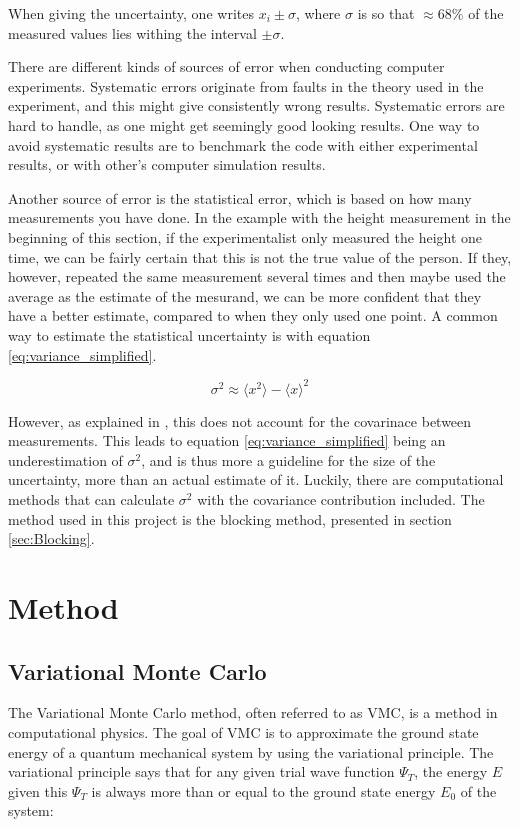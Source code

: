 \documentclass[norsk,a4paper,12pt]{article}
\begin{document}
When giving the uncertainty, one writes $x_i \pm \sigma$, where $\sigma$ is so that $\approx 68 \%$ of the measured values lies withing the interval $\pm \sigma$. 

There are different kinds of sources of error when conducting computer experiments. Systematic errors originate from faults in the theory used in the experiment, and this might give consistently wrong results. Systematic errors are hard to handle, as one might get seemingly good looking results. One way to avoid systematic results are to benchmark the code with either experimental results, or with other's computer simulation results. \par 
\vspace{3mm}
Another source of error is the statistical error, which is based on how many measurements you have done. In the example with the height measurement in the beginning of this section, if the experimentalist only measured the height one time, we can be fairly certain that this is not the true value of the person. If they, however, repeated the same measurement several times and then maybe used the average as the estimate of the mesurand, we can be more confident that they have a better estimate, compared to when they only used one point. A common way to estimate the statistical uncertainty is with equation \ref{eq:variance_simplified}.

\begin{equation}
\label{eq:variance_simplified}
\sigma^2 \approx \langle x^2 \rangle - \langle x \rangle^2
\end{equation}

However, as explained in \cite{Nordhagen}, this does not account for the covarinace between measurements. This leads to equation \ref{eq:variance_simplified} being an underestimation of $\sigma^2$, and is thus more a guideline for the size of the uncertainty, more than an actual estimate of it. Luckily, there are computational methods that can calculate $\sigma^2$ with the covariance contribution included. The method used in this project is the blocking method, presented in section \ref{sec:Blocking}.

\section{Method}

\subsection{Variational Monte Carlo}
The Variational Monte Carlo method, often referred to as VMC, is a method in computational physics. The goal of VMC is to approximate the ground state energy of a quantum mechanical system by using the variational principle. The variational principle says that for any given trial wave function $\Psi_T$, the energy $E$ given this $\Psi_T$ is always more than or equal to the ground state energy $E_0$ of the system:
\end{document}
